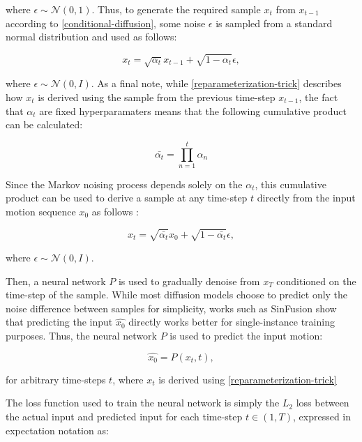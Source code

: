 \documentclass[a4paper, 12pt]{report}
\begin{document}
where \(\epsilon \sim \mathcal{N}(0, 1)\). Thus, to generate the required sample \(x_t\) from \(x_{t-1}\) according to \ref{conditional-diffusion},  some noise \(\epsilon\) is sampled from a standard normal distribution and used as follows:

\begin{equation} \label{reparameterization-trick}
	x_t = \sqrt{\alpha_t}x_{t-1} + \sqrt{1 - \alpha_t} \epsilon,
\end{equation}

where \(\epsilon \sim \mathcal{N}(0, I)\). As a final note, while \ref{reparameterization-trick} describes how \(x_t\) is derived using the sample from the previous time-step \(x_{t-1}\), the fact that \(\alpha_t\) are fixed hyperparamaters means that the following cumulative product can be calculated:

\begin{equation}
	\bar{\alpha_t} = \prod_{n=1}^{t} \alpha_n
\end{equation}

Since the Markov noising process depends solely on the \(\alpha_t\), this cumulative product can be used to derive a sample at any time-step \(t\) directly from the input motion sequence \(x_0\) as follows \cite{nichol_improved_2021}:

\begin{equation} \label{sample-noised-directly}
	x_t = \sqrt{\bar{\alpha_t}} x_0 + \sqrt{1-\bar{\alpha_t}} \epsilon,
\end{equation}

where \(\epsilon \sim \mathcal{N}(0, I)\).

Then, a neural network \(P\) is used to gradually denoise from \(x_T\) conditioned on the time-step of the sample. While most diffusion models choose to predict only the noise difference between samples for simplicity, works such as SinFusion \cite{nikankin_sinfusion_2023} show that predicting the input \(\hat{x_0}\) directly works better for single-instance training purposes. Thus, the neural network \(P\) is used to predict the input motion:

\begin{equation}
	\hat{x_0} = P(x_t, t),
\end{equation}

for arbitrary time-steps \(t\), where \(x_t\) is derived using \ref{reparameterization-trick}

The loss function used to train the neural network is simply the \(L_2\) loss between the actual input and predicted input for each time-step \(t \in (1, T)\), expressed in expectation notation as:
\end{document}
